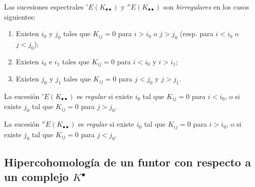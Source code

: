 \begin{env}[11.3.6]
\label{0.11.3.6}
\label{0.11.3.6-fr}
Las sucesiones espectrales $'E(K_{\bullet\bullet})$ y $''E(K_{\bullet\bullet})$ son \emph{birregulares} en los casos siguientes:
\begin{enumerate}
  \item[\textit{a)}] Existen $i_0$ y $j_0$ tales que $K_{ij}=0$ para $i>i_0$ o $j>j_0$ (resp. para $i<i_0$
    o $j<j_0$);
  \item[\textit{b)}] Existen $i_0$ e $i_1$ tales que $K_{ij}=0$ para $i<i_0$ y $i>i_1$;
  \item[\textit{c)}] Existen $j_0$ y $j_1$ tales que $K_{ij}=0$ para $j<j_0$ y $j>j_1$.
\end{enumerate}

La sucesión $'E(K_{\bullet\bullet})$ es \emph{regular} si existe $i_0$ tal que $K_{ij}=0$ para $i<i_0$, o si existe $j_0$ tal que $K_{ij}=0$ para $j>j_0$.

La sucesión $''E(K_{\bullet\bullet})$ es \emph{regular} si existe $i_0$ tal que $K_{ij}=0$ para $i>i_0$, o si existe $j_0$ tal que $K_{ij}=0$ para $j<j_0$.
\end{env}


\subsection{Hipercohomología de un funtor con respecto a un complejo $K^\bullet$}
\label{subsection:0.11.4}
\label{subsection:0.11.4-fr}

